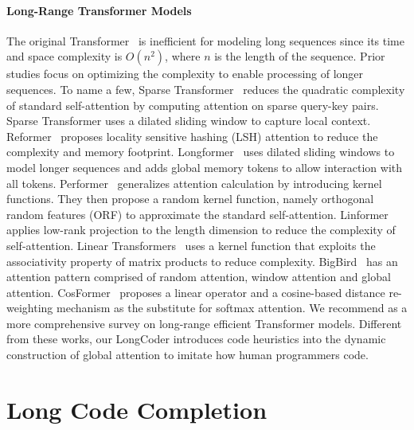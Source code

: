 \documentclass{article}
\begin{document}
\paragraph{Long-Range Transformer Models} The original Transformer~\citep{transformer} is inefficient for modeling long sequences since its time and space complexity is $O(n^2)$, where $n$ is the length of the sequence. Prior studies focus on optimizing the complexity to enable processing of longer sequences. To name a few, Sparse Transformer~\citep{child2019generating} reduces the quadratic complexity of standard self-attention  by computing attention on sparse query-key pairs. Sparse Transformer uses a dilated sliding window to capture  local context. Reformer~\citep{reformer} proposes locality sensitive hashing (LSH) attention to reduce the complexity and memory footprint. Longformer~\cite{beltagy2020longformer} uses dilated sliding windows to model longer sequences and adds global memory tokens to allow interaction with all tokens. Performer~\citep{performer} generalizes attention calculation by introducing kernel functions. They then propose a random kernel function, namely orthogonal random features (ORF) to approximate the standard self-attention. Linformer~\cite{wang2020linformer} applies low-rank projection to the length dimension to reduce the complexity of self-attention. Linear Transformers~\cite{lineartransformer} uses a kernel function that exploits the associativity property of matrix products to reduce  complexity. 
BigBird~\citep{bigbird} has an attention pattern comprised of random attention, window attention and global attention. CosFormer~\citep{cosformer} proposes a linear operator and a cosine-based distance re-weighting mechanism as the substitute for softmax attention.
We recommend \citet{tay2022efficient} as a more comprehensive survey on long-range efficient Transformer models. Different from these works, our LongCoder introduces code heuristics into the dynamic construction of global attention to imitate how human programmers code.

\section{Long Code Completion}
\label{sec:lcc}
\end{document}
